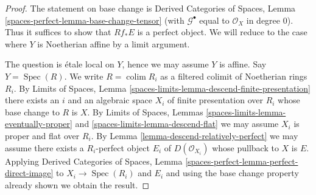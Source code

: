 \documentclass[10pt,a4paper]{amsart}
\theoremstyle{plain}
\theoremstyle{definition}
\theoremstyle{remark}
\numberwithin{equation}{subsection}
\def\colim{\mathop{\mathrm{colim}}\nolimits}
\def\Spec{\mathop{\mathrm{Spec}}}
\begin{document}
\begin{proof}
The statement on base change is Derived Categories of Spaces,
Lemma \ref{spaces-perfect-lemma-base-change-tensor} (with
$\mathcal{G}^\bullet$ equal to $\mathcal{O}_X$ in degree $0$).
Thus it suffices to show that $Rf_*E$ is a perfect object. We will reduce
to the case where $Y$ is Noetherian affine by a limit argument.

\medskip\noindent
The question is \'etale local on $Y$, hence we may assume $Y$ is affine.
Say $Y = \Spec(R)$. We write $R = \colim R_i$ as a filtered colimit
of Noetherian rings $R_i$. By Limits of Spaces, Lemma
\ref{spaces-limits-lemma-descend-finite-presentation}
there exists an $i$ and an algebraic space
$X_i$ of finite presentation over $R_i$
whose base change to $R$ is $X$. By
Limits of Spaces, Lemmas \ref{spaces-limits-lemma-eventually-proper} and
\ref{spaces-limits-lemma-descend-flat}
we may assume $X_i$ is proper and flat over $R_i$.
By Lemma \ref{lemma-descend-relatively-perfect}
we may assume there exists a $R_i$-perfect object $E_i$ of
$D(\mathcal{O}_{X_i})$ whose pullback to $X$ is $E$.
Applying Derived Categories of Spaces,
Lemma \ref{spaces-perfect-lemma-perfect-direct-image}
to $X_i \to \Spec(R_i)$ and $E_i$ and using the
base change property already shown we obtain the result.
\end{proof}
\end{document}
